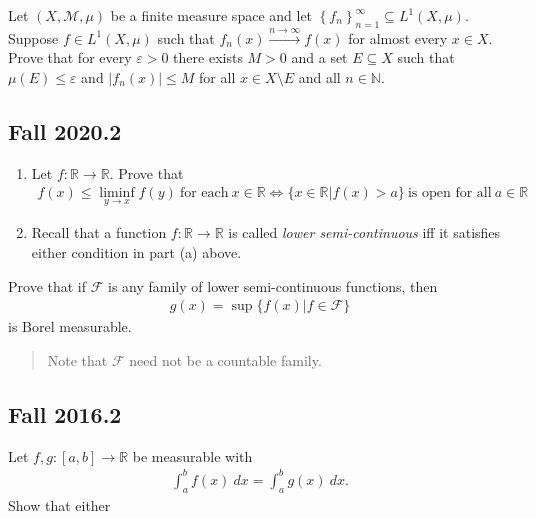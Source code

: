 Let \((X, \mathcal{M}, \mu)\) be a finite measure space and let
\(\left\{{ f_n}\right\}_{n=1}^{\infty } \subseteq L^1(X, \mu)\). Suppose
\(f\in L^1(X, \mu)\) such that \(f_n(x) \overset{n\to \infty }\to f(x)\)
for almost every \(x \in X\). Prove that for every \({\varepsilon}> 0\)
there exists \(M>0\) and a set \(E\subseteq X\) such that
\(\mu(E) \leq {\varepsilon}\) and
\({\left\lvert {f_n(x)} \right\rvert}\leq M\) for all
\(x\in X\setminus E\) and all \(n\in {\mathbb{N}}\).

\hypertarget{fall-2020.2}{%
\subsection{Fall 2020.2}\label{fall-2020.2}}

\begin{enumerate}
\def\labelenumi{\alph{enumi}.}
\item
  Let \(f: {\mathbb{R}}\to {\mathbb{R}}\). Prove that
  \begin{align*}
  f(x) \leq \liminf_{y\to x} f(y)~ \text{for each}~ x\in {{\mathbb{R}}} \iff \{ x\in {{\mathbb{R}}} \mathrel{\Big|}f(x) > a \}~\text{is open for all}~ a\in {{\mathbb{R}}}
  \end{align*}
\item
  Recall that a function \(f: {{\mathbb{R}}} \to {{\mathbb{R}}}\) is
  called \emph{lower semi-continuous} iff it satisfies either condition
  in part (a) above.
\end{enumerate}

Prove that if \(\mathcal{F}\) is any family of lower semi-continuous
functions, then
\begin{align*}
g(x) = \sup\{ f(x) \mathrel{\Big|}f\in \mathcal{F}\}
\end{align*}
is Borel measurable.

\begin{quote}
Note that \(\mathcal{F}\) need not be a countable family.
\end{quote}

\hypertarget{fall-2016.2}{%
\subsection{Fall 2016.2}\label{fall-2016.2}}

Let \(f, g: [a, b] \to {\mathbb{R}}\) be measurable with
\begin{align*}
\int_{a}^{b} f(x) ~d x=\int_{a}^{b} g(x) ~d x.
\end{align*}
Show that either

